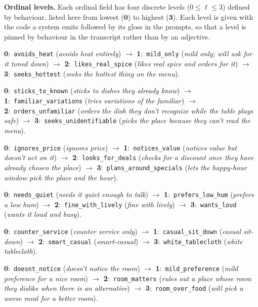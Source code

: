 \documentclass{article}
\begin{document}
\textbf{Ordinal levels.} Each ordinal field has four discrete levels ($0 \le \ell \le 3$) defined by behaviour, listed here from
lowest ($\mathbf{0}$) to highest ($\mathbf{3}$). Each level is given with the code a system emits
followed by its gloss in the prompts, so that a level is pinned by behaviour in the transcript
rather than by an adjective.
\begin{description}\setlength{\itemsep}{1pt}\small
  \item[\texttt{spice\_tolerance}] \textbf{0}:~\texttt{avoids\_heat} (\emph{avoids heat entirely}) $\to$ \textbf{1}:~\texttt{mild\_only} (\emph{mild only; will ask for it toned down}) $\to$ \textbf{2}:~\texttt{likes\_real\_spice} (\emph{likes real spice and orders for it}) $\to$ \textbf{3}:~\texttt{seeks\_hottest} (\emph{seeks the hottest thing on the menu}).
  \item[\texttt{adventurousness}] \textbf{0}:~\texttt{sticks\_to\_known} (\emph{sticks to dishes they already know}) $\to$ \textbf{1}:~\texttt{familiar\_variations} (\emph{tries variations of the familiar}) $\to$ \textbf{2}:~\texttt{orders\_unfamiliar} (\emph{orders the dish they don't recognize while the table plays safe}) $\to$ \textbf{3}:~\texttt{seeks\_unidentifiable} (\emph{picks the place \emph{because} they can't read the menu}).
  \item[\texttt{deal\_seeking}] \textbf{0}:~\texttt{ignores\_price} (\emph{ignores price}) $\to$ \textbf{1}:~\texttt{notices\_value} (\emph{notices value but doesn't act on it}) $\to$ \textbf{2}:~\texttt{looks\_for\_deals} (\emph{checks for a discount once they have already chosen the place}) $\to$ \textbf{3}:~\texttt{plans\_around\_specials} (\emph{lets the happy-hour window pick the place and the hour}).
  \item[\texttt{noise\_preference}] \textbf{0}:~\texttt{needs\_quiet} (\emph{needs it quiet enough to talk}) $\to$ \textbf{1}:~\texttt{prefers\_low\_hum} (\emph{prefers a low hum}) $\to$ \textbf{2}:~\texttt{fine\_with\_lively} (\emph{fine with lively}) $\to$ \textbf{3}:~\texttt{wants\_loud} (\emph{wants it loud and busy}).
  \item[\texttt{formality\_ceiling}] \textbf{0}:~\texttt{counter\_service} (\emph{counter service only}) $\to$ \textbf{1}:~\texttt{casual\_sit\_down} (\emph{casual sit-down}) $\to$ \textbf{2}:~\texttt{smart\_casual} (\emph{smart-casual}) $\to$ \textbf{3}:~\texttt{white\_tablecloth} (\emph{white tablecloth}).
  \item[\texttt{design\_sensitivity}] \textbf{0}:~\texttt{doesnt\_notice} (\emph{doesn't notice the room}) $\to$ \textbf{1}:~\texttt{mild\_preference} (\emph{mild preference for a nice room}) $\to$ \textbf{2}:~\texttt{room\_matters} (\emph{rules out a place whose room they dislike when there is an alternative}) $\to$ \textbf{3}:~\texttt{room\_over\_food} (\emph{will pick a worse meal for a better room}).

\end{description}
\end{document}
